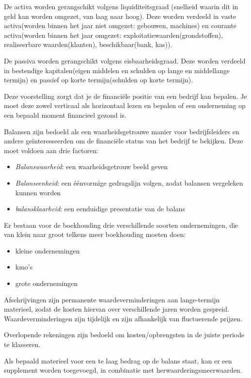 \documentclass[../../samenvatting.tex]{subfiles}
\begin{document}
De activa worden gerangschikt volgens liquiditeitsgraad (snelheid waarin dit in geld kan worden omgezet, van laag naar hoog). Deze worden verdeeld in vaste activa(worden binnen het jaar niet omgezet: gebouwen, machines) en courante activa(worden binnen het jaar omgezet: exploitatiewaarden(grondstoffen), realiseerbare waarden(klanten), beschikbaar(bank, kas)).

De passiva worden gerangschikt volgens eisbaarheidsgraad. Deze worden verdeeld in bestendige kapitalen(eigen middelen en schulden op lange en middellange termijn) en passief op korte termijn(schulden op korte termijn).

Deze voorstelling zorgt dat je de financiële positie van een bedrijf kan bepalen. Je moet deze zowel verticaal als horizontaal lezen en bepalen of een onderneming op een bepaald moment financieel gezond is.

Balansen zijn bedoeld als een waarheidsgetrouwe manier voor bedrijfsleiders en andere geïnteresseerden om de financiële status van het bedrijf te bekijken. Deze moet voldoen aan drie factoren:
\begin{itemize}
    \item \emph{Balanswaarheid}: een waarheidsgetrouw beeld geven
    \item \emph{Balanseenheid}: een éénvormige gedragslijn volgen, zodat balansen vergeleken kunnen worden
    \item \emph{balansklaarheid}: een eenduidige presentatie van de balans
\end{itemize}

Er bestaan voor de boekhouding drie verschillende soorten ondernemingen, die van klein naar groot telkens meer boekhouding moeten doen:
\begin{itemize}
    \item kleine ondernemingen
    \item kmo's
    \item grote ondernemingen
\end{itemize}

Afschrijvingen zijn permanente waardeverminderingen aan lange-termijn materieel, zodat de kosten hiervan over verschillende jaren worden gespreid. Waardeverminderingen zijn tijdelijk en zijn afhankelijk van fluctuerende prijzen.

Overlopende rekeningen zijn bedoeld om kosten/opbrengsten in de juiste periode te klasseren.

Als bepaald materieel voor een te laag bedrag op de balans staat, kan er een supplement worden toegevoegd, in combinatie met herwaarderingsmeerwaarden.
\end{document}
